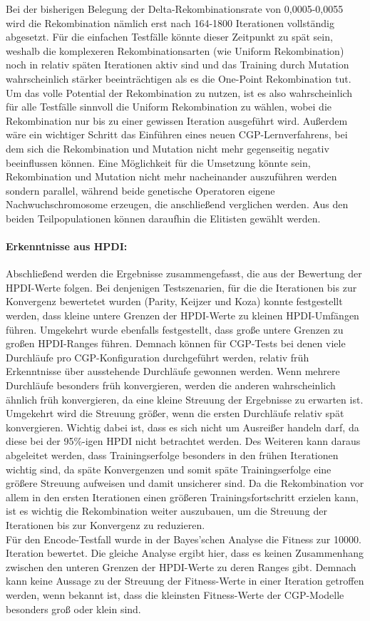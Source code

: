 Bei der bisherigen Belegung der Delta-Rekombinationsrate von 0,0005-0,0055 wird die Rekombination nämlich erst nach 164-1800 Iterationen vollständig abgesetzt.
Für die einfachen Testfälle könnte dieser Zeitpunkt zu spät sein, weshalb die komplexeren Rekombinationsarten (wie Uniform Rekombination) noch in relativ späten Iterationen aktiv sind und das Training durch Mutation wahrscheinlich stärker beeinträchtigen als es die One-Point Rekombination tut.
Um das volle Potential der Rekombination zu nutzen, ist es also wahrscheinlich für alle Testfälle sinnvoll die Uniform Rekombination zu wählen, wobei die Rekombination nur bis zu einer gewissen Iteration ausgeführt wird.
Außerdem wäre ein wichtiger Schritt das Einführen eines neuen CGP-Lernverfahrens, bei dem sich die Rekombination und Mutation nicht mehr gegenseitig negativ beeinflussen können.
Eine Möglichkeit für die Umsetzung könnte sein, Rekombination und Mutation nicht mehr nacheinander auszuführen werden sondern parallel, während beide genetische Operatoren eigene Nachwuchschromosome erzeugen, die anschließend verglichen werden.
Aus den beiden Teilpopulationen können daraufhin die Elitisten gewählt werden.
\paragraph{Erkenntnisse aus HPDI:}
Abschließend werden die Ergebnisse zusammengefasst, die aus der Bewertung der HPDI-Werte folgen.
Bei denjenigen Testszenarien, für die die Iterationen bis zur Konvergenz bewertetet wurden (Parity, Keijzer und Koza) konnte festgestellt werden, dass kleine untere Grenzen der HPDI-Werte zu kleinen HPDI-Umfängen führen.
Umgekehrt wurde ebenfalls festgestellt, dass große untere Grenzen zu großen HPDI-Ranges führen.
Demnach können für CGP-Tests bei denen viele Durchläufe pro CGP-Konfiguration durchgeführt werden, relativ früh Erkenntnisse über ausstehende Durchläufe gewonnen werden.
Wenn mehrere Durchläufe besonders früh konvergieren, werden die anderen wahrscheinlich ähnlich früh konvergieren, da eine kleine Streuung der Ergebnisse zu erwarten ist.
Umgekehrt wird die Streuung größer, wenn die ersten Durchläufe relativ spät konvergieren.
Wichtig dabei ist, dass es sich nicht um Ausreißer handeln darf, da diese bei der 95\%-igen HPDI nicht betrachtet werden.
Des Weiteren kann daraus abgeleitet werden, dass Trainingserfolge besonders in den frühen Iterationen wichtig sind, da späte Konvergenzen und somit späte Trainingserfolge eine größere Streuung aufweisen und damit unsicherer sind.
Da die Rekombination vor allem in den ersten Iterationen einen größeren Trainingsfortschritt erzielen kann, ist es wichtig die Rekombination weiter auszubauen, um die Streuung der Iterationen bis zur Konvergenz zu reduzieren.\\
Für den Encode-Testfall wurde in der Bayes'schen Analyse die Fitness zur 10000. Iteration bewertet.
Die gleiche Analyse ergibt hier, dass es keinen Zusammenhang zwischen den unteren Grenzen der HPDI-Werte zu deren Ranges gibt.
Demnach kann keine Aussage zu der Streuung der Fitness-Werte in einer Iteration getroffen werden, wenn bekannt ist, dass die kleinsten Fitness-Werte der CGP-Modelle besonders groß oder klein sind.

